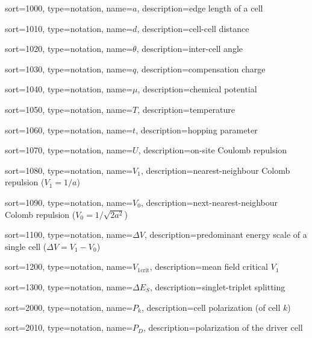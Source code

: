 {
  sort=1000,
  type=notation,
  name={\ensuremath{a}},
  description={edge length of a cell}
}

{
  sort=1010,
  type=notation,
  name={\ensuremath{d}},
  description={cell-cell distance}
}

{
  sort=1020,
  type=notation,
  name={\ensuremath{\theta}},
  description={inter-cell angle}
}

{
  sort=1030,
  type=notation,
  name={\ensuremath{q}},
  description={compensation charge}
}

{
  sort=1040,
  type=notation,
  name={\ensuremath{\mu}},
  description={chemical potential}
}

{
  sort=1050,
  type=notation,
  name={\ensuremath{T}},
  description={temperature}
}

{
  sort=1060,
  type=notation,
  name={\ensuremath{t}},
  description={hopping parameter}
}

{
  sort=1070,
  type=notation,
  name={\ensuremath{U}},
  description={on-site Coulomb repulsion}
}

{
  sort=1080,
  type=notation,
  name={\ensuremath{V_1}},
  description={nearest-neighbour Colomb repulsion ($V_1 = 1/a$)}
}

{
  sort=1090,
  type=notation,
  name={\ensuremath{V_0}},
  description={next-nearest-neighbour Colomb repulsion ($V_0 = 1/\sqrt{2a^2}$)}
}

{
  sort=1100,
  type=notation,
  name={\ensuremath{\Delta V}},
  description={predominant energy scale of a single cell ($\Delta V = V_1 - V_0$)}
}

{
  sort=1200,
  type=notation,
  name={\ensuremath{V_{1\mathrm{crit}}}},
  description={mean field critical $V_1$}
}

{
  sort=1300,
  type=notation,
  name={\ensuremath{\Delta E_S}},
  description={singlet-triplet splitting}
}

{
  sort=2000,
  type=notation,
  name={\ensuremath{P_k}},
  description={cell polarization (of cell $k$)}
}

{
  sort=2010,
  type=notation,
  name={\ensuremath{P_D}},
  description={polarization of the driver cell}
}

